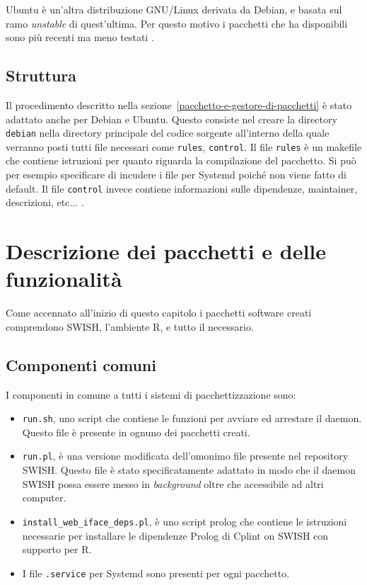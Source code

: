 \documentclass[10pt,titlepage,twoside,a4paper]{report}
\begin{document}
Ubuntu è un'altra distribuzione GNU/Linux derivata da Debian, e basata sul ramo 
\emph{unstable} di quest'ultima. Per questo motivo i pacchetti che ha 
disponibili sono più recenti ma meno testati \cite{ubuntu}.

\subsection{Struttura}
Il procedimento descritto nella sezione~\ref{pacchetto-e-gestore-di-pacchetti}
è stato adattato anche per Debian e Ubuntu. Questo consiste nel creare la 
directory \texttt{debian} nella directory principale del codice sorgente 
all'interno della quale verranno posti tutti file necessari come 
\texttt{rules}, \texttt{control}.  Il file \texttt{rules} è un makefile che 
contiene istruzioni per quanto riguarda la compilazione del pacchetto. Si può 
per esempio specificare di incudere i file per Systemd poiché non viene fatto 
di default. Il file \texttt{control} invece contiene informazioni sulle 
dipendenze, maintainer, descrizioni, etc... \cite{debianPackaging}.


\section{Descrizione dei pacchetti e delle funzionalità}
Come accennato all'inizio di questo capitolo i pacchetti software creati 
comprendono SWISH, l'ambiente R, e tutto il necessario.

\subsection{Componenti comuni}
I componenti in comune a tutti i sistemi di pacchettizzazione sono:
\begin{itemize}
    \item \texttt{run.sh}, uno script che contiene le funzioni per avviare ed  
          arrestare il daemon. Questo file è presente in ognuno dei pacchetti
          creati.

    \item \texttt{run.pl}, è una versione modificata dell'omonimo file presente
          nel repository SWISH. Questo file è stato specificatamente adattato
          in modo che il daemon SWISH possa essere messo in 
          \emph{background} oltre che accessibile ad altri computer.

    \item \texttt{install\_web\_iface\_deps.pl}, è uno script prolog che 
contiene le istruzioni necessarie per installare le dipendenze Prolog di Cplint 
on SWISH con supporto per R.

    \item I file \texttt{.service} per Systemd sono presenti per ogni 
          pacchetto.
\end{itemize}
\end{document}
